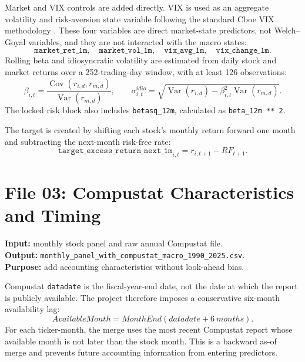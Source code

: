 \documentclass[11pt,a4paper]{article}
\newcommand{\code}[1]{\texttt{#1}}
\newcommand{\target}{\code{target\_excess\_return\_next\_1m}}
\begin{document}
Market and VIX controls are added directly. VIX is used as an aggregate volatility and risk-aversion state variable following the standard Cboe VIX methodology \cite{cboe2019}. These four variables are direct market-state predictors, not Welch--Goyal variables, and they are not interacted with the macro states:
\[
\code{market\_ret\_1m},\quad \code{market\_vol\_1m},\quad
\code{vix\_avg\_1m},\quad \code{vix\_change\_1m}.
\]
Rolling beta and idiosyncratic volatility are estimated from daily stock and market returns over a 252-trading-day window, with at least 126 observations:
\[
  \beta_{i,t}=\frac{\operatorname{Cov}(r_{i,d},r_{m,d})}{\operatorname{Var}(r_{m,d})},
  \qquad
  \sigma^{idio}_{i,t}=\sqrt{\operatorname{Var}(r_{i,d})-\beta_{i,t}^{2}\operatorname{Var}(r_{m,d})}.
\]
The locked risk block also includes \code{betasq\_12m}, calculated as \code{beta\_12m ** 2}.

The target is created by shifting each stock's monthly return forward one month and subtracting the next-month risk-free rate:
\[
  \target_{i,t}=r_{i,t+1}-RF_{t+1}.
\]

\section{File 03: Compustat Characteristics and Timing}

\textbf{Input:} monthly stock panel and raw annual Compustat file. \\
\textbf{Output:} \code{monthly\_panel\_with\_compustat\_macro\_1990\_2025.csv}. \\
\textbf{Purpose:} add accounting characteristics without look-ahead bias.

Compustat \code{datadate} is the fiscal-year-end date, not the date at which the report is publicly available. The project therefore imposes a conservative six-month availability lag:
\[
  AvailableMonth = MonthEnd(datadate + 6\ months).
\]
For each ticker-month, the merge uses the most recent Compustat report whose available month is not later than the stock month. This is a backward as-of merge and prevents future accounting information from entering predictors.
\end{document}
